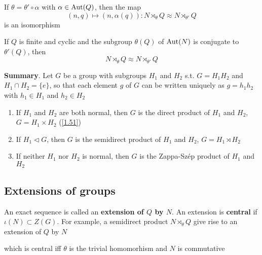 \documentclass[11pt]{article}
\begin{document}
\begin{lemma}[]
If \(\theta=\theta'\circ\alpha\) with \(\alpha\in\operatorname{\text{Aut}}(Q)\), then the map
\begin{equation*}
(n,q)\mapsto(n,\alpha(q)):N\rtimes_\theta Q\approx N\rtimes_{\theta'}Q
\end{equation*}
is an isomorphism
\end{lemma}

\begin{lemma}[]
If \(Q\) is finite and cyclic and the subgroup \(\theta(Q)\) of \(\operatorname{\text{Aut}}(N)\) is conjugate
to \(\theta'(Q)\), then
\begin{equation*}
N\rtimes_\theta Q\approx N\rtimes_{\theta'}Q
\end{equation*}
\end{lemma}

\textbf{Summary}. Let \(G\) be a group with subgroups \(H_1\) and \(H_2\) s.t. \(G=H_1H_2\)
 and \(H_1\cap H_2=\{e\}\), so that each element \(g\) of \(G\) can be written uniquely as \(g=h_1h_2\)
 with \(h_1\in H_1\) and \(h_2\in H_2\)
\begin{enumerate}
\item If \(H_1\) and \(H_2\) are both normal, then \(G\) is the direct product of \(H_1\)
and \(H_2\), \(G=H_1\times H_2\) (\ref{1.51})
\item If \(H_1\lhd G\), then \(G\) is the semidirect product of \(H_1\) and \(H_2\), \(G=H_1\rtimes H_2\)
\item If neither \(H_1\) nor \(H_2\) is normal, then \(G\) is the Zappa-Szép product of \(H_1\)
and \(H_2\)
\end{enumerate}
\subsection{Extensions of groups}
\label{sec:orgb428d0f}
\begin{center}\end{center}
An exact sequence is called an \textbf{extension of \(Q\) by \(N\)}. An extension is \textbf{central}
if \(\iota(N)\subset Z(G)\). For example, a semidirect product \(N\rtimes_\theta Q\) give rise to an extension
of \(Q\) by \(N\)
\begin{center}\end{center}
which is central iff \(\theta\) is the trivial homomorhism and \(N\) is commutative
\end{document}
